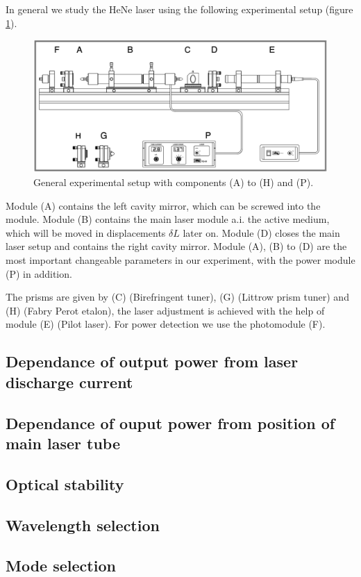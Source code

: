 \documentclass[../main.tex]{subfiles}
\begin{document}
In general we study the HeNe laser using the following experimental setup (figure \ref{fig:general_setup}).
\begin{figure}[H]
    \centering
    \includegraphics[width=0.8\linewidth]{Bilddateien/Versuchsaufbau/general_setup.png}
    \caption{General experimental setup with components (A) to (H) and (P).}
    \label{fig:general_setup}
\end{figure}
Module (A) contains the left cavity mirror, which can be screwed into the module. Module (B) contains the main laser module a.i. the active medium, which will be moved in displacements $\delta L$ later on. Module (D) closes the main laser setup and contains the right cavity mirror. Module (A), (B) to (D) are the most important changeable parameters in our experiment, with the power module (P) in addition. 

The prisms are given by (C) (Birefringent tuner), (G) (Littrow prism tuner) and (H) (Fabry Perot etalon), the laser adjustment is achieved with the help of module (E) (Pilot laser). For power detection we use the photomodule (F). 


\subsection{Dependance of output power from laser discharge current}
    

\subsection{Dependance of ouput power from position of main laser tube}
    

\subsection{Optical stability}
    

\subsection{Wavelength selection}
    

\subsection{Mode selection}

\end{document}
